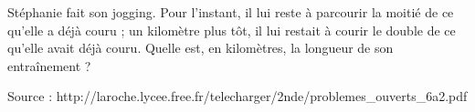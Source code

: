 
Stéphanie fait son jogging. Pour l'instant, il lui reste à parcourir la moitié de ce qu'elle a déjà couru ;  un  kilomètre  plus  tôt,  il  lui  restait  à  courir  le  double  de  ce  qu'elle  avait déjà couru. Quelle est, en kilomètres, la longueur de son entraînement ? 

\hfill{{\scriptsize Source : http://laroche.lycee.free.fr/telecharger/2nde/problemes\_ouverts\_6a2.pdf}}